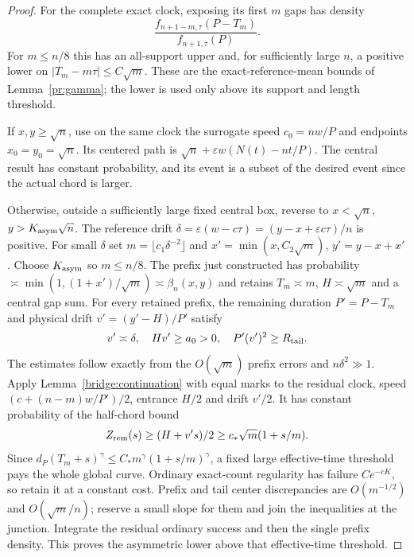 \begin{proof}
For the complete exact clock, exposing its first $m$ gaps has density
\[
 \frac{f_{n+1-m,\tau}(P-T_m)}{f_{n+1,\tau}(P)}.
\]
For $m\le n/8$ this has an all-support upper and, for sufficiently
large $n$, a positive lower on $|T_m-m\tau|\le C\sqrt m$.
These are the exact-reference-mean bounds of Lemma~\ref{pr:gamma};
the lower is used only above its support and length threshold.

If $x,y\ge\sqrt n$, use on the same clock the surrogate speed
$c_0=nw/P$ and endpoints $x_0=y_0=\sqrt n$.
Its centered path is $\sqrt n+\varepsilon w(N(t)-nt/P)$.
The central result has constant probability, and its event is a
subset of the desired event since the actual chord is larger.

Otherwise, outside a sufficiently large fixed central box, reverse
to $x<\sqrt n$, $y>K_{\rm asym}\sqrt n$. The reference drift
$\delta=\varepsilon(w-c\tau)=(y-x+\varepsilon c\tau)/n$
is positive. For small $\delta$ set
$m=\lfloor c_1\delta^{-2}\rfloor$ and
$x'=\min(x,C_2\sqrt m)$, $y'=y-x+x'$.
Choose $K_{\rm asym}$ so $m\le n/8$. The prefix just constructed
has probability
$\asymp\min(1,(1+x')/\sqrt m)\asymp\beta_n(x,y)$ and retains
$T_m\asymp m$, $H\asymp\sqrt m$ and a central gap sum.
For every retained prefix, the remaining duration $P'=P-T_m$ and
physical drift $v'=(y'-H)/P'$ satisfy
\[
 v'\asymp\delta,\quad Hv'\ge a_0>0,\quad P'(v')^2\ge R_{\rm tail}.
\]
The estimates follow exactly from the $O(\sqrt m)$ prefix errors
and $n\delta^2\gg1$. Apply Lemma~\ref{bridge:continuation} with
equal marks to the residual clock, speed
$(c+(n-m)w/P')/2$, entrance $H/2$ and drift $v'/2$.
It has constant probability of the half-chord bound
\[
 Z_{\rm rem}(s)\ge(H+v's)/2
      \ge c_*\sqrt m(1+s/m).
\]
Since $d_P(T_m+s)^\gamma\le C_*m^\gamma(1+s/m)^\gamma$,
a fixed large effective-time threshold pays the whole global curve.
Ordinary exact-count regularity has failure $Ce^{-cK}$, so retain
it at a constant cost. Prefix and tail center discrepancies are
$O(m^{-1/2})$ and $O(\sqrt m/n)$; reserve a small slope for them
and join the inequalities at the junction. Integrate the residual
ordinary success and then the single prefix density. This proves
the asymmetric lower above that effective-time threshold.


\end{proof}
